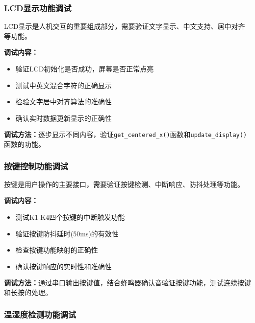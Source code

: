 \subsubsection{LCD显示功能调试}

\qquad LCD显示是人机交互的重要组成部分，需要验证文字显示、中文支持、居中对齐等功能。

\textbf{调试内容：}
\begin{itemize}
    \vspace{-6pt}
  \item 验证LCD初始化是否成功，屏幕是否正常点亮
    \vspace{-6pt}
  \item 测试中英文混合字符的正确显示
    \vspace{-6pt}
  \item 检验文字居中对齐算法的准确性
    \vspace{-6pt}
  \item 确认实时数据更新显示的正确性
\end{itemize}

\textbf{调试方法：}逐步显示不同内容，验证\texttt{get\_centered\_x()}函数和\texttt{update\_display()}函数的功能。

\subsubsection{按键控制功能调试}

\qquad 按键是用户操作的主要接口，需要验证按键检测、中断响应、防抖处理等功能。

\textbf{调试内容：}
\begin{itemize}
    \vspace{-6pt}
  \item 测试K1-K4四个按键的中断触发功能
    \vspace{-6pt}
  \item 验证按键防抖延时(50ms)的有效性
    \vspace{-6pt}
  \item 检查按键功能映射的正确性
    \vspace{-6pt}
  \item 确认按键响应的实时性和准确性
\end{itemize}

\textbf{调试方法：}通过串口输出按键值，结合蜂鸣器确认音验证按键功能，测试连续按键和长按的处理。

\subsubsection{温湿度检测功能调试}

